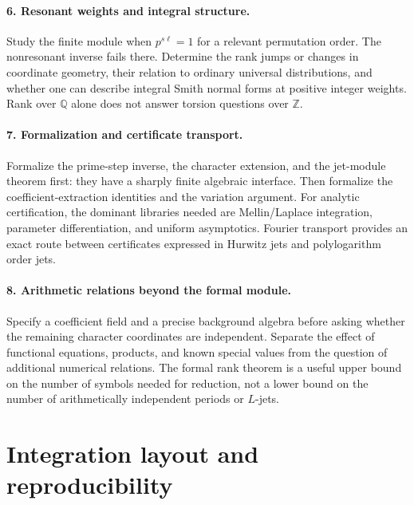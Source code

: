 \documentclass[11pt]{article}
\theoremstyle{definition}
\theoremstyle{remark}
\newcommand{\QQ}{\mathbb Q}
\newcommand{\ZZ}{\mathbb Z}
\begin{document}
\paragraph{6. Resonant weights and integral structure.}
Study the finite module when $p^{s\ell}=1$ for a relevant permutation order. The nonresonant inverse fails there. Determine the rank jumps or changes in coordinate geometry, their relation to ordinary universal distributions, and whether one can describe integral Smith normal forms at positive integer weights. Rank over $\QQ$ alone does not answer torsion questions over $\ZZ$.

\paragraph{7. Formalization and certificate transport.}
Formalize the prime-step inverse, the character extension, and the jet-module theorem first: they have a sharply finite algebraic interface. Then formalize the coefficient-extraction identities and the variation argument. For analytic certification, the dominant libraries needed are Mellin/Laplace integration, parameter differentiation, and uniform asymptotics. Fourier transport provides an exact route between certificates expressed in Hurwitz jets and polylogarithm order jets.

\paragraph{8. Arithmetic relations beyond the formal module.}
Specify a coefficient field and a precise background algebra before asking whether the remaining character coordinates are independent. Separate the effect of functional equations, products, and known special values from the question of additional numerical relations. The formal rank theorem is a useful upper bound on the number of symbols needed for reduction, not a lower bound on the number of arithmetically independent periods or $L$-jets.

\appendix
\section{Integration layout and reproducibility}
\label{app:layout}
\end{document}
